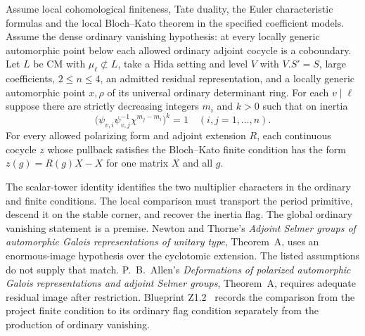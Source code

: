 \begin{formalstatement}\label{pn:P025}
Assume local cohomological finiteness, Tate duality, the Euler
characteristic formulas and the local Bloch--Kato theorem in the
specified coefficient models. Assume the dense ordinary vanishing
hypothesis: at every locally generic automorphic point below each
allowed ordinary adjoint cocycle is a coboundary. Let \(L\) be CM with
\(\mu_\ell\not\subset L\), take a Hida setting and level \(V\) with
\(V.S'=S\), large coefficients, \(2\le n\le4\), an admitted residual
representation, and a locally generic automorphic point \(x,\rho\)
of its universal ordinary determinant ring. For each \(v\mid\ell\)
suppose there are strictly decreasing integers \(m_i\) and \(k>0\)
such that on inertia
\[
 \bigl(\psi_{v,i}\psi_{v,j}^{-1}\chi^{m_j-m_i}\bigr)^k=1
 \quad(i,j=1,\ldots,n).
\]
For every allowed polarizing form and adjoint extension \(R\), each
continuous cocycle \(z\) whose pullback satisfies the Bloch--Kato
finite condition has the form \(z(g)=R(g)X-X\) for one matrix \(X\)
and all \(g\).
\end{formalstatement}

The scalar-tower identity identifies the two multiplier characters in
the ordinary and finite conditions. The local comparison must transport
the period primitive, descend it on the stable corner, and recover the
inertia flag. The global ordinary vanishing statement is a premise.
Newton and Thorne's \emph{Adjoint Selmer groups of automorphic Galois
representations of unitary type}, Theorem~A, uses an enormous-image
hypothesis over the cyclotomic extension. The listed assumptions do
not supply that match. P.~B.~Allen's \emph{Deformations of polarized
automorphic Galois representations and adjoint Selmer groups}, Theorem~A,
requires adequate residual image after restriction. Blueprint Z1.2~
records the comparison from the project finite condition to its ordinary
flag condition separately from the production of ordinary vanishing.
\cite{r21-nt}\quad\cite{r21-allen}
